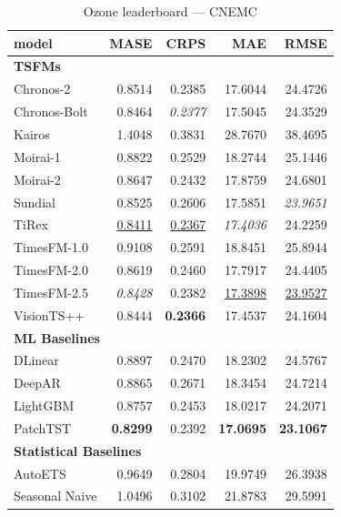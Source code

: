 \begin{table}[H]
\caption{Ozone leaderboard --- CNEMC}
\centering
\begin{small}
\begin{tabular}{lrrrr}
\toprule
model & MASE & CRPS & MAE & RMSE \\
\midrule
\multicolumn{5}{l}{\textbf{TSFMs}} \\
Chronos-2 & 0.8514 & 0.2385 & 17.6044 & 24.4726 \\
Chronos-Bolt & 0.8464 & \textit{0.2377} & 17.5045 & 24.3529 \\
Kairos & 1.4048 & 0.3831 & 28.7670 & 38.4695 \\
Moirai-1 & 0.8822 & 0.2529 & 18.2744 & 25.1446 \\
Moirai-2 & 0.8647 & 0.2432 & 17.8759 & 24.6801 \\
Sundial & 0.8525 & 0.2606 & 17.5851 & \textit{23.9651} \\
TiRex & \underline{0.8411} & \underline{0.2367} & \textit{17.4036} & 24.2259 \\
TimesFM-1.0 & 0.9108 & 0.2591 & 18.8451 & 25.8944 \\
TimesFM-2.0 & 0.8619 & 0.2460 & 17.7917 & 24.4405 \\
TimesFM-2.5 & \textit{0.8428} & 0.2382 & \underline{17.3898} & \underline{23.9527} \\
VisionTS++ & 0.8444 & \textbf{0.2366} & 17.4537 & 24.1604 \\
\midrule
\multicolumn{5}{l}{\textbf{ML Baselines}} \\
DLinear & 0.8897 & 0.2470 & 18.2302 & 24.5767 \\
DeepAR & 0.8865 & 0.2671 & 18.3454 & 24.7214 \\
LightGBM & 0.8757 & 0.2453 & 18.0217 & 24.2071 \\
PatchTST & \textbf{0.8299} & 0.2392 & \textbf{17.0695} & \textbf{23.1067} \\
\midrule
\multicolumn{5}{l}{\textbf{Statistical Baselines}} \\
AutoETS & 0.9649 & 0.2804 & 19.9749 & 26.3938 \\
Seasonal Naive & 1.0496 & 0.3102 & 21.8783 & 29.5991 \\
\bottomrule
\end{tabular}
\end{small}
\end{table}